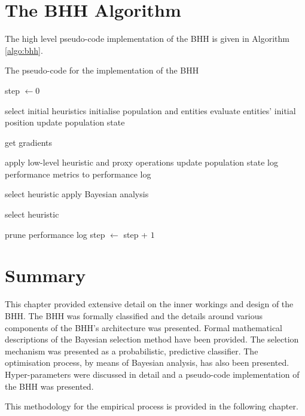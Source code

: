 \section{The \acs{BHH} Algorithm}
\label{sec:bhh:algorithm}

The high level pseudo-code implementation of the \acs{BHH} is given in Algorithm \ref{algo:bhh}.

\begin{algorithm}[htb]
      \caption{The pseudo-code for the implementation of the \acf{BHH}}
      \label{algo:bhh}
      \begin{algorithmic}
            \State step $\gets 0$

            \State select initial heuristics
            \State initialise population and entities
            \State evaluate entities' initial position
            \State update population state

            \State get gradients
            \EndIf

            \State apply low-level heuristic and proxy operations
            \State update population state
            \State log performance metrics to performance log

            \State select heuristic
            \Else
            \State apply Bayesian analysis
            \EndIf

            \State select heuristic
            \EndIf

            \State prune performance log
            \EndIf
            \EndIf
            \EndFor
            \State step $\gets$ step + $1$
            \EndWhile
      \end{algorithmic}
\end{algorithm}

\section{Summary}
\label{sec:bhh:summary}

This chapter provided extensive detail on the inner workings and design of the \acs{BHH}. The \acs{BHH} was formally classified and the details around various components of the \acs{BHH}'s architecture was presented. Formal mathematical descriptions of the Bayesian selection method have been provided. The selection mechanism was presented as a probabilistic, predictive classifier. The optimisation process, by means of Bayesian analysis, has also been presented. Hyper-parameters were discussed in detail and a pseudo-code implementation of the \acs{BHH} was presented.

This methodology for the empirical process is provided in the following chapter.
